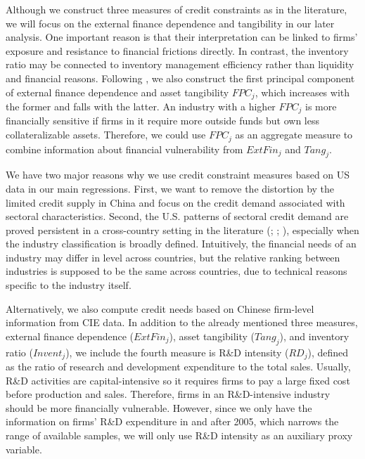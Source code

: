 \documentclass[12pt]{article}
\begin{document}
Although we construct three measures of credit constraints as in the literature, we will focus on the external finance dependence and tangibility in our later analysis. One important reason is that their interpretation can be linked to firms' exposure and resistance to financial frictions directly. In contrast, the inventory ratio may be connected to inventory management efficiency rather than liquidity and financial reasons. Following \cite{manova-wei-zhang2015}, we also construct the first principal component of external finance dependence and asset tangibility $FPC_j$, which increases with the former and falls with the latter. An industry with a higher $FPC_j$ is more financially sensitive if firms in it require more outside funds but own less collateralizable assets. Therefore, we could use $FPC_j$ as an aggregate measure to combine information about financial vulnerability from $ExtFin_j$ and $Tang_j$.

We have two major reasons why we use credit constraint measures based on US data in our main regressions. First, we want to remove the distortion by the limited credit supply in China and focus on the credit demand associated with sectoral characteristics. Second, the U.S. patterns of sectoral credit demand are proved persistent in a cross-country setting in the literature (\cite{kroszner2007}; \cite{manova-wei-zhang2015}; \cite{fan-lai-li2015}), especially when the industry classification is broadly defined. Intuitively, the financial needs of an industry may differ in level across countries, but the relative ranking between industries is supposed to be the same across countries, due to technical reasons specific to the industry itself.

Alternatively, we also compute credit needs based on Chinese firm-level information from CIE data. In addition to the already mentioned three measures, external finance dependence ($ExtFin_j$), asset tangibility ($Tang_j$), and inventory ratio ($Invent_j$), we include the fourth measure is R\&D intensity ($RD_j$), defined as the ratio of research and development expenditure to the total sales. Usually, R\&D activities are capital-intensive so it requires firms to pay a large fixed cost before production and sales. Therefore, firms in an R\&D-intensive industry should be more financially vulnerable. However, since we only have the information on firms' R\&D expenditure in and after 2005, which narrows the range of available samples, we will only use R\&D intensity as an auxiliary proxy variable. 
\end{document}
